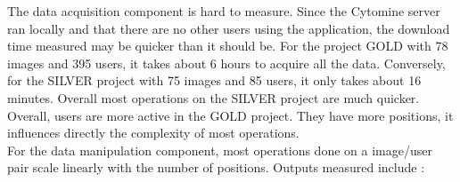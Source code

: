 \documentclass[a4paper,11pt]{report}
\numberwithin{figure}{chapter} %
\begin{document}
    The data acquisition component is hard to measure.
    Since the Cytomine server ran locally and that there are no other users using the application, the download time measured may be quicker than it should be.
    For the project GOLD with 78 images and 395 users, it takes about 6 hours to acquire all the data.
    Conversely, for the SILVER project with 75 images and 85 users, it only takes about 16 minutes.
    Overall most operations on the SILVER project are much quicker.
    Overall, users are more active in the GOLD project.
    They have more positions, it influences directly the complexity of most operations.\\


    For the data manipulation component, most operations done on a image/user pair scale linearly with the number of positions.
    Outputs measured include :
\end{document}
